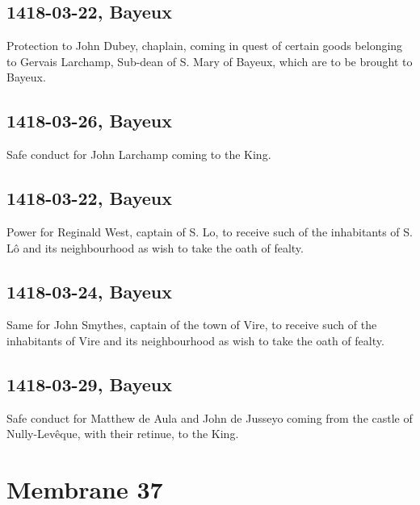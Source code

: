 \documentclass[a4paper,12pt,twoside]{book}
\begin{document}
            \subsection{1418-03-22, Bayeux}
            
                     Protection to John Dubey, chaplain, coming in quest of certain goods belonging to Gervais Larchamp, Sub-dean of S. Mary of Bayeux, which are to be brought to Bayeux.
                  
            \subsection{1418-03-26, Bayeux}
            
                     Safe conduct for John Larchamp coming to the King.
                  
            \subsection{1418-03-22, Bayeux}
            
                     Power for Reginald West, captain of S. Lo, to receive such of the inhabitants of S. Lô and its neighbourhood as wish to take the oath of fealty.
                  
            \subsection{1418-03-24, Bayeux}
            
                     Same for John Smythes, captain of the town of Vire, to receive such of the inhabitants of Vire and its neighbourhood as wish to take the oath of fealty.
                  
            \subsection{1418-03-29, Bayeux}
            
                     Safe conduct for Matthew de Aula and John de Jusseyo coming from the castle of Nully-Levêque, with their retinue, to the King.
                  
            \newpage
        
        \section{Membrane 37}
        
\end{document}
